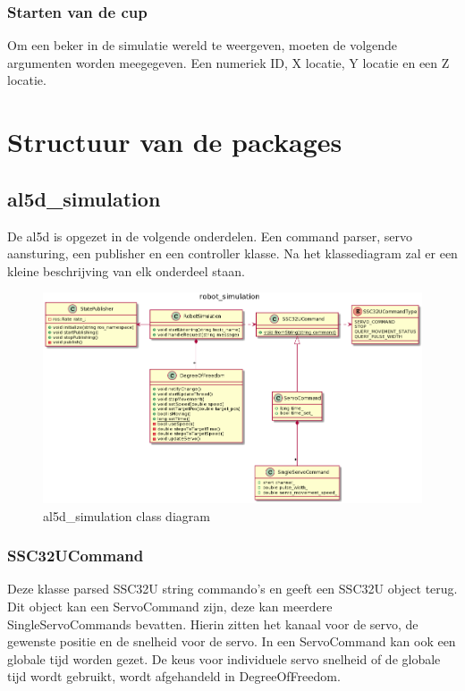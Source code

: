 \documentclass[11pt,titlepage]{article}
\begin{document}
\subsubsection{Starten van de cup}
Om een beker in de simulatie wereld te weergeven, moeten de volgende argumenten worden meegegeven. Een numeriek ID, X locatie, Y locatie en een Z locatie. 

\section{Structuur van de packages}

\subsection{al5d\_simulation}

De al5d is opgezet in de volgende onderdelen. Een command parser, servo aansturing, een publisher en een controller klasse. Na het klassediagram zal er een kleine beschrijving van elk onderdeel staan.

\begin{figure}[H]
\centering
    \includegraphics[scale = .4]{robot_sim_plantuml.png}
    \caption{al5d\_simulation class diagram}
    \label{figure:al5d_simulation}
\end{figure}

\subsubsection{SSC32UCommand}
Deze klasse parsed SSC32U string commando's en geeft een SSC32U object terug. Dit object kan een ServoCommand zijn, deze kan meerdere SingleServoCommands bevatten. Hierin zitten het kanaal voor de servo, de gewenste positie en de snelheid voor de servo. In een ServoCommand kan ook een globale tijd worden gezet. De keus voor individuele servo snelheid of de globale tijd wordt gebruikt, wordt afgehandeld in DegreeOfFreedom.
\end{document}
